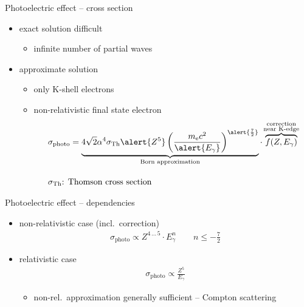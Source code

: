 \documentclass[11pt,xcolor=dvipsnames,professionalfonts,notes]{beamer}
\begin{document}
\begin{frame}{Photoelectric effect -- cross section}
	\begin{itemize}
		\setlength\itemsep{1.5em}
		\item exact solution difficult
		\begin{itemize}
			\item infinite number of partial waves
		\end{itemize}
		\item approximate solution
		\begin{itemize}
			\item only K-shell electrons
			\item non-relativistic final state electron			
			\begin{align*}
				&\sigma_\mathrm{photo} = \underbrace{4\sqrt{2} \alpha^4 \sigma_\mathrm{Th} \alert{Z^5}  \left( \frac{m_\mathrm{e}c^2}{\alert{E_\gamma}} \right)^{\alert{\frac{7}{2}}}}_{\text{Born approximation}} \cdot \, \overbrace{f(Z, E_\gamma)}^{\mathclap{\substack{\text{correction}\\\text{near K-edge}}}} \\[1em]
				&\sigma_\mathrm{Th}\text{: Thomson cross section}
			\end{align*}
		\end{itemize}
	\end{itemize}
\end{frame}


\begin{frame}{Photoelectric effect -- dependencies}
	\begin{itemize}
		\setlength\itemsep{1.5em}
		\item non-relativistic case (incl.\ correction)
		\begin{align*}
		\sigma_\mathrm{photo} \propto Z^{4 \, \dots \, 5} \cdot E_\gamma^{n} \qquad n \leq - \frac{7}{2}
		\end{align*}
		
		\item relativistic case
		\begin{align*}
			\sigma_\mathrm{photo} \propto \frac{Z^5}{E_\gamma}
		\end{align*}
		\begin{itemize}
			\item non-rel.\ approximation generally sufficient -- Compton scattering
		\end{itemize} 
	\end{itemize}
\end{frame}
\end{document}
